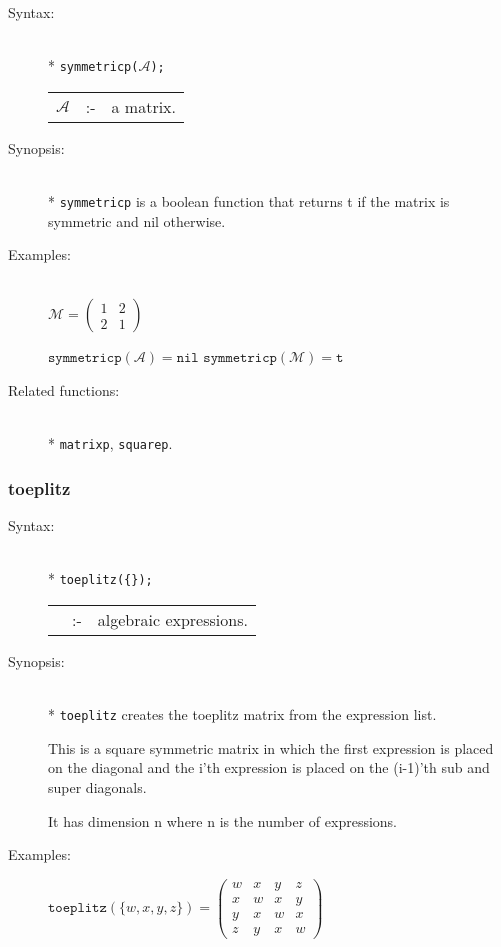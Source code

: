 \begin{description}
\item[Syntax:]\mbox{}\\*
\texttt{symmetricp($\mathcal{A}$);}\\[2mm]
\begin{tabular}{l l l}
$\mathcal{A}$ &:-& a matrix.
\end{tabular}

\item[Synopsis:]\mbox{}\\*
\texttt{symmetricp} is a boolean function that returns t if the
                matrix is symmetric and nil otherwise.

\item[Examples:]\mbox{}\\
  \(\mathcal{M} = \begin{pmatrix} 1 & 2 \\ 2 & 1 \end{pmatrix}\)

  \(\texttt{symmetricp}(\mathcal{A}) = \texttt{nil}\)
  \(\texttt{symmetricp}(\mathcal{M}) = \texttt{t}\)

\item[Related functions:]\mbox{}\\*
\texttt{matrixp}, \texttt{squarep}.
\end{description}


\subsubsection{toeplitz}
\label{linalg:toeplitz}

\begin{description}
\item[Syntax:]\mbox{}\\*
\texttt{toeplitz(\{\exprlist{}\});} \lazyfootnote{}\\[2mm]
\begin{tabular}{l l l}
\exprlist{} &:-& algebraic expressions.
\end{tabular}

\item[Synopsis:]\mbox{}\\*
\texttt{toeplitz} creates the toeplitz matrix from the
                expression list.

This is a square symmetric matrix in
                which the first expression is placed on the diagonal
                and the i'th expression is placed on the (i-1)'th sub
                and super diagonals.

It has dimension n where n is the
                number of expressions.

\item[Examples:]
\begin{flushleft}
\(
\texttt{toeplitz}(\{w,x,y,z\}) =
        \begin{pmatrix} w & x & y & z \\ x & w & x & y \\
      y & x & w & x \\ z & y & x & w
\end{pmatrix}
\)
\end{flushleft}
\end{description}

